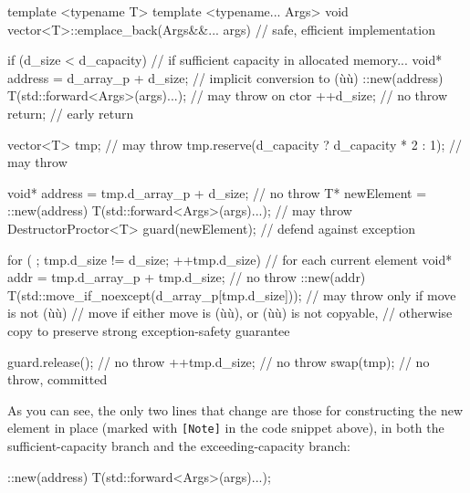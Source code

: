 \begin{emcppslisting}
template <typename T>
template <typename... Args>
void vector<T>::emplace_back(Args&&... args)  // safe, efficient implementation
{
    if (d_size < d_capacity)  // if sufficient capacity in allocated memory...
    {
        void* address = d_array_p + d_size;  // implicit conversion to (ù{}ù)
        ::new(address) T(std::forward<Args>(args)...);  // may throw on ctor
        ++d_size;                            // no throw
        return;                              // early return
    }

    vector<T> tmp;                                 // may throw
    tmp.reserve(d_capacity ? d_capacity * 2 : 1);  // may throw

    void* address = tmp.d_array_p + d_size;        // no throw
    T* newElement = ::new(address) T(std::forward<Args>(args)...); // may throw
    DestructorProctor<T> guard(newElement);        // defend against exception

    for ( ; tmp.d_size != d_size; ++tmp.d_size)    // for each current element
    {
        void* addr = tmp.d_array_p + tmp.d_size;   // no throw
        ::new(addr) T(std::move_if_noexcept(d_array_p[tmp.d_size]));
            // may throw only if move is not (ù{}ù)
            // move if either move is (ù{}ù), or (ù{}ù) is not copyable,
            // otherwise copy to preserve strong exception-safety guarantee
    }

    guard.release();  // no throw
    ++tmp.d_size;     // no throw
    swap(tmp);        // no throw, committed
}
\end{emcppslisting}
    

\noindent As you can see, the only two lines that change are those for
constructing the new element in place (marked with \lstinline![Note]! in
the code snippet above), in both the sufficient-capacity branch and the
exceeding-capacity branch:

\begin{emcppslisting}
::new(address) T(std::forward<Args>(args)...);
\end{emcppslisting}
    

